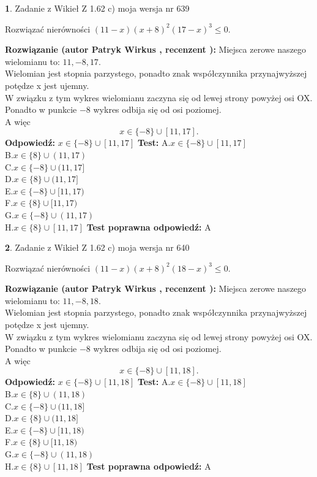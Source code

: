 \documentclass[12pt, a4paper]{article}
\theoremstyle{definition} %
\newtheorem{zad}{}
\newcommand{\zadStart}[1]{\begin{zad}#1\newline}
\newcommand{\zadStop}{\end{zad}}
\newcommand{\rozwStart}[2]{\noindent \textbf{Rozwiązanie (autor #1 , recenzent #2): }\newline}
\newcommand{\rozwStop}{\newline}
\newcommand{\odpStart}{\noindent \textbf{Odpowiedź:}\newline}
\newcommand{\odpStop}{\newline}
\newcommand{\testStart}{\noindent \textbf{Test:}\newline}
\newcommand{\testStop}{\newline}
\newcommand{\kluczStart}{\noindent \textbf{Test poprawna odpowiedź:}\newline}
\newcommand{\kluczStop}{\newline}
\begin{document}
\zadStart{Zadanie z Wikieł Z 1.62 c) moja wersja nr 639}

Rozwiązać nierówności $(11-x)(x+8)^{2}(17-x)^{3}\le0$.
\zadStop
\rozwStart{Patryk Wirkus}{}
Miejsca zerowe naszego wielomianu to: $11, -8, 17$.\\
Wielomian jest stopnia parzystego, ponadto znak współczynnika przy\linebreak najwyższej potędze x jest ujemny.\\ W związku z tym wykres wielomianu zaczyna się od lewej strony powyżej osi OX.\\
Ponadto w punkcie $-8$ wykres odbija się od osi poziomej.\\
A więc $$x \in \{-8\} \cup [11,17].$$
\rozwStop
\odpStart
$x \in \{-8\} \cup [11,17]$
\odpStop
\testStart
A.$x \in \{-8\} \cup [11,17]$\\
B.$x \in \{8\} \cup (11,17)$\\
C.$x \in \{-8\} \cup (11,17]$\\
D.$x \in \{8\} \cup (11,17]$\\
E.$x \in \{-8\} \cup [11,17)$\\
F.$x \in \{8\} \cup [11,17)$\\
G.$x \in \{-8\} \cup (11,17)$\\
H.$x \in \{8\} \cup [11,17]$
\testStop
\kluczStart
A
\kluczStop



\zadStart{Zadanie z Wikieł Z 1.62 c) moja wersja nr 640}

Rozwiązać nierówności $(11-x)(x+8)^{2}(18-x)^{3}\le0$.
\zadStop
\rozwStart{Patryk Wirkus}{}
Miejsca zerowe naszego wielomianu to: $11, -8, 18$.\\
Wielomian jest stopnia parzystego, ponadto znak współczynnika przy\linebreak najwyższej potędze x jest ujemny.\\ W związku z tym wykres wielomianu zaczyna się od lewej strony powyżej osi OX.\\
Ponadto w punkcie $-8$ wykres odbija się od osi poziomej.\\
A więc $$x \in \{-8\} \cup [11,18].$$
\rozwStop
\odpStart
$x \in \{-8\} \cup [11,18]$
\odpStop
\testStart
A.$x \in \{-8\} \cup [11,18]$\\
B.$x \in \{8\} \cup (11,18)$\\
C.$x \in \{-8\} \cup (11,18]$\\
D.$x \in \{8\} \cup (11,18]$\\
E.$x \in \{-8\} \cup [11,18)$\\
F.$x \in \{8\} \cup [11,18)$\\
G.$x \in \{-8\} \cup (11,18)$\\
H.$x \in \{8\} \cup [11,18]$
\testStop
\kluczStart
A
\kluczStop
\end{document}
